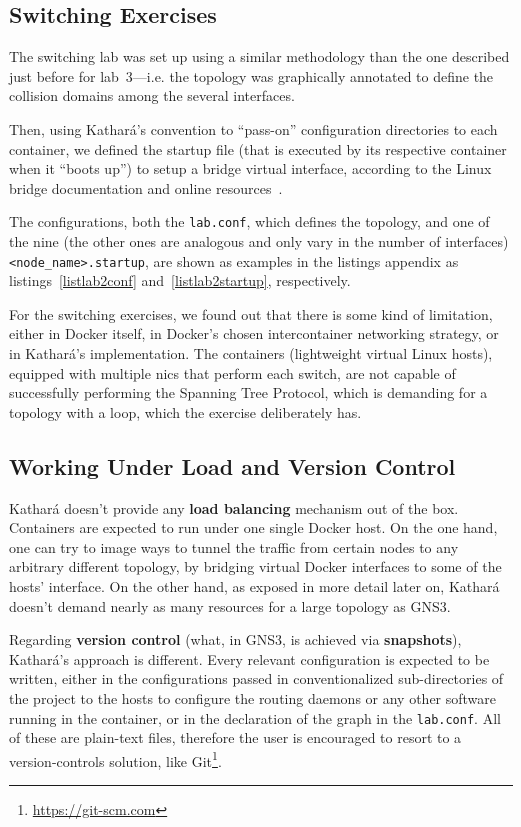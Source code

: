 \subsection{Switching Exercises}

The switching lab was set up using a similar methodology than the one described just before for lab~3---i.e. the topology was graphically annotated to define the collision domains among the several interfaces.

Then, using Kathará's convention to ``pass-on'' configuration directories to each container, we defined the startup file (that is executed by its respective container when it ``boots up'') to setup a bridge virtual interface, according to the Linux bridge documentation and online resources~\cite{brctlman,howtobridgelinux}.

The configurations, both the \texttt{lab.conf}, which defines the topology, and one of the nine (the other ones are analogous and only vary in the number of interfaces) \texttt{<node\_name>.startup}, are shown as examples in the listings appendix as listings~\ref{listlab2conf} and~\ref{listlab2startup}, respectively.

For the switching exercises, we found out that there is some kind of limitation, either in Docker itself, in Docker's chosen intercontainer networking strategy, or in Kathará's implementation.
The containers (lightweight virtual Linux hosts), equipped with multiple \glspl{nic} that perform each switch, are not capable of successfully performing the Spanning Tree Protocol, which is demanding for a topology with a loop, which the exercise deliberately has.

\subsection{Working Under Load and Version Control}

Kathará doesn't provide any \textbf{load balancing} mechanism out of the box.
Containers are expected to run under one single Docker host.
On the one hand, one can try to image ways to tunnel the traffic from certain nodes to any arbitrary different topology, by bridging virtual Docker interfaces to some of the hosts' interface.
On the other hand, as exposed in more detail later on, Kathará doesn't demand nearly as many resources for a large topology as GNS3.

Regarding \textbf{version control} (what, in GNS3, is achieved via \textbf{snapshots}), Kathará's approach is different.
Every relevant configuration is expected to be written, either in the configurations passed in conventionalized sub-directories of the project to the hosts to configure the routing daemons or any other software running in the container, or in the declaration of the graph in the \texttt{lab.conf}.
All of these are plain-text files, therefore the user is encouraged to resort to a version-controls solution, like Git\footnote{\url{https://git-scm.com}}.

